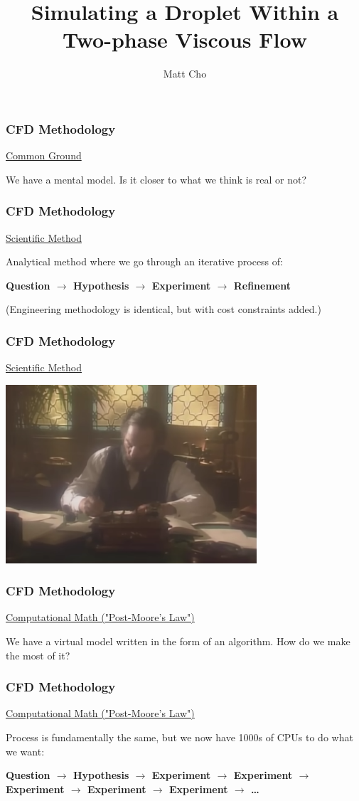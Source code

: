 \documentclass[12pt]{beamer}
\author{Matt Cho}
\title{Simulating a Droplet Within a Two-phase Viscous Flow}
\date{}
\begin{document}
\maketitle

\begin{frame}
    \frametitle{CFD Methodology}
    \underline{Common Ground}

    We have a mental model. Is it closer to what we think is real or not?
\end{frame}
\begin{frame}
    \frametitle{CFD Methodology}
    \underline{Scientific Method}

    Analytical method where we go through an iterative process of:

    \textbf{Question $\rightarrow$ Hypothesis $\rightarrow$ Experiment $\rightarrow$ Refinement}

    (Engineering methodology is identical, but with cost constraints added.)
\end{frame}
\begin{frame}
    \frametitle{CFD Methodology}
    \underline{Scientific Method}

    \includegraphics[width=0.7\textwidth]{img/0-caltech-maxwell.png}
\end{frame}
\begin{frame}
    \frametitle{CFD Methodology}
    \underline{Computational Math ("Post-Moore's Law")}

    We have a virtual model written in the form of an algorithm. How do we make the most of it?
\end{frame}
\begin{frame}
    \frametitle{CFD Methodology}
    \underline{Computational Math ("Post-Moore's Law")}

    Process is fundamentally the same, but we now have 1000s of CPUs to do 
    what we want:

    \textbf{Question $\rightarrow$ Hypothesis $\rightarrow$ Experiment $\rightarrow$ Experiment $\rightarrow$ Experiment $\rightarrow$ Experiment $\rightarrow$ Experiment $\rightarrow$ \dots}
\end{frame}
\end{document}

